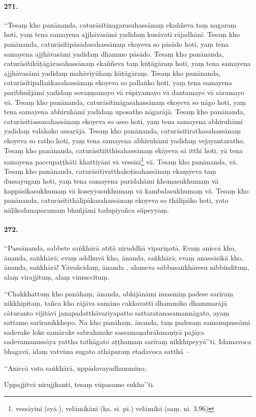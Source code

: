 \paragraph{271.} ‘‘Tesaṃ kho panānanda, caturāsītinagarasahassānaṃ ekaññeva taṃ nagaraṃ hoti, yaṃ tena samayena ajjhāvasāmi yadidaṃ kusāvatī rājadhānī. Tesaṃ kho panānanda, caturāsītipāsādasahassānaṃ ekoyeva so pāsādo hoti, yaṃ tena samayena ajjhāvasāmi yadidaṃ dhammo pāsādo. Tesaṃ kho panānanda, caturāsītikūṭāgārasahassānaṃ ekaññeva taṃ kūṭāgāraṃ hoti, yaṃ tena samayena ajjhāvasāmi yadidaṃ mahāviyūhaṃ kūṭāgāraṃ. Tesaṃ kho panānanda, caturāsītipallaṅkasahassānaṃ ekoyeva so pallaṅko hoti, yaṃ tena samayena paribhuñjāmi yadidaṃ sovaṇṇamayo vā rūpiyamayo vā dantamayo vā sāramayo vā. Tesaṃ kho panānanda, caturāsītināgasahassānaṃ ekoyeva so nāgo hoti, yaṃ tena samayena abhiruhāmi yadidaṃ uposatho nāgarājā. Tesaṃ kho panānanda, caturāsītiassasahassānaṃ ekoyeva so asso hoti, yaṃ tena samayena abhiruhāmi yadidaṃ valāhako assarājā. Tesaṃ kho panānanda, caturāsītirathasahassānaṃ ekoyeva so ratho hoti, yaṃ tena samayena abhiruhāmi yadidaṃ vejayantaratho. Tesaṃ kho panānanda, caturāsītiitthisahassānaṃ ekāyeva sā itthī hoti, yā tena samayena paccupaṭṭhāti khattiyānī vā vessinī\footnote{vessāyinī (syā.), velāmikānī (ka. sī. pī.) velāmikā (saṃ. ni. 3.96)} vā. Tesaṃ kho panānanda, vā. Tesaṃ kho panānanda, caturāsītivatthakoṭisahassānaṃ ekaṃyeva taṃ dussayugaṃ hoti, yaṃ tena samayena paridahāmi khomasukhumaṃ vā kappāsikasukhumaṃ vā koseyyasukhumaṃ vā kambalasukhumaṃ vā. Tesaṃ kho panānanda, caturāsītithālipākasahassānaṃ ekoyeva so thālipāko hoti, yato nāḷikodanaparamaṃ bhuñjāmi tadupiyañca sūpeyyaṃ.

\paragraph{272.} ‘‘Passānanda, sabbete saṅkhārā atītā niruddhā vipariṇatā. Evaṃ aniccā kho, ānanda, saṅkhārā; evaṃ addhuvā kho, ānanda, saṅkhārā; evaṃ anassāsikā kho, ānanda, saṅkhārā! Yāvañcidaṃ, ānanda , alameva sabbasaṅkhāresu nibbindituṃ, alaṃ virajjituṃ, alaṃ vimuccituṃ.

‘‘Chakkhattuṃ kho panāhaṃ, ānanda, abhijānāmi imasmiṃ padese sarīraṃ nikkhipitaṃ, tañca kho rājāva samāno cakkavattī dhammiko dhammarājā cāturanto vijitāvī janapadatthāvariyapatto sattaratanasamannāgato, ayaṃ sattamo sarīranikkhepo. Na kho panāhaṃ, ānanda, taṃ padesaṃ samanupassāmi sadevake loke samārake sabrahmake sassamaṇabrāhmaṇiyā pajāya sadevamanussāya yattha tathāgato aṭṭhamaṃ sarīraṃ nikkhipeyyā’’ti. Idamavoca bhagavā, idaṃ vatvāna sugato athāparaṃ etadavoca satthā –

‘‘Aniccā vata saṅkhārā, uppādavayadhammino;

Uppajjitvā nirujjhanti, tesaṃ vūpasamo sukho’’ti.


